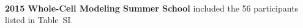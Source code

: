 \documentclass[journal,transmag]{IEEEtran}
\begin{document}
\begin{IEEEbiography}{}
~\\
~\\
~\\
~\\
~\\
~\\
~\\
~\\
~\\
~\\
~\\
\textbf{2015 Whole-Cell Modeling Summer School} included the 56 participants listed in Table~SI.
\end{IEEEbiography}



\vfill



\clearpage
\setcounter{table}{0}
\renewcommand{\thetable}{S\Roman{table}}
\end{document}
